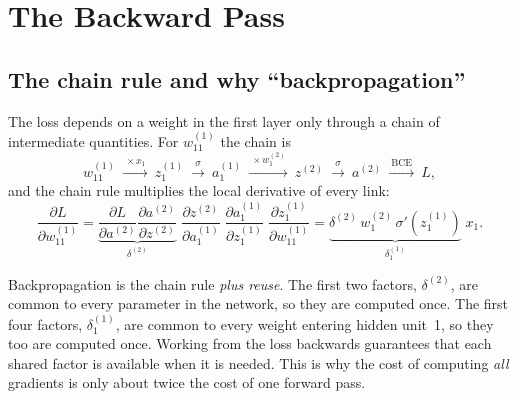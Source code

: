 \documentclass[11pt]{article}
\begin{document}
\section{The Backward Pass}
\subsection{The chain rule and why ``backpropagation''}
The loss depends on a weight in the first layer only through a chain of intermediate quantities. For $w^{(1)}_{11}$ the chain is
\[
w^{(1)}_{11}\ \xrightarrow{\ \times x_1\ }\ z^{(1)}_1\ \xrightarrow{\ \sigma\ }\ a^{(1)}_1\ \xrightarrow{\ \times w^{(2)}_1\ }\ z^{(2)}\ \xrightarrow{\ \sigma\ }\ a^{(2)}\ \xrightarrow{\ \text{BCE}\ }\ L ,
\]
and the chain rule multiplies the local derivative of every link:
\[
\frac{\partial L}{\partial w^{(1)}_{11}}=
\underbrace{\frac{\partial L}{\partial a^{(2)}}\frac{\partial a^{(2)}}{\partial z^{(2)}}}_{\delta^{(2)}}\;
\frac{\partial z^{(2)}}{\partial a^{(1)}_1}\;
\frac{\partial a^{(1)}_1}{\partial z^{(1)}_1}\;
\frac{\partial z^{(1)}_1}{\partial w^{(1)}_{11}}
=\underbrace{\delta^{(2)}\,w^{(2)}_1\,\sigma'(z^{(1)}_1)}_{\delta^{(1)}_1}\;x_1 .
\]
\begin{keypoint}Backpropagation is the chain rule \emph{plus reuse}. The first two factors, $\delta^{(2)}$, are common to every parameter in the network, so they are computed once. The first four factors, $\delta^{(1)}_1$, are common to every weight entering hidden unit~1, so they too are computed once. Working from the loss backwards guarantees that each shared factor is available when it is needed. This is why the cost of computing \emph{all} gradients is only about twice the cost of one forward pass.\end{keypoint}
\end{document}
